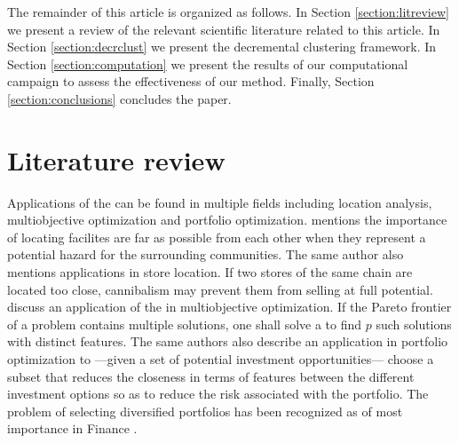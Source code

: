 \documentclass[ijoo,nonblindrev]{informs-ijoo}
\begin{document}
The remainder of this article is organized as follows. In Section \ref{section:litreview} we present a review of the relevant scientific literature related to this article. In Section \ref{section:decrclust} we present the decremental clustering framework. In Section \ref{section:computation} we present the results of our computational campaign to assess the effectiveness of our method. Finally, Section \ref{section:conclusions} concludes the paper.

\section{Literature review\label{section:litreview}}

Applications of the \pDP{} can be found in multiple fields including location analysis, multiobjective optimization and portfolio optimization. \citet{Kuby1987Programming} mentions the importance of locating facilites are far as possible from each other when they represent a potential hazard for the surrounding communities. The same author also mentions applications in store location. If two stores of the same chain are located too close, cannibalism may prevent them from selling at full potential. \citet{Saboonchi2014MaxMinMin} discuss an application of the \pDP{} in multiobjective optimization. If the Pareto frontier of a problem contains multiple solutions, one shall solve a \pDP{} to find $p$ such solutions with distinct features. The same authors also describe an application in portfolio optimization to ---given a set of potential investment opportunities--- choose a subset that reduces the closeness in terms of features between the different investment options so as to reduce the risk associated with the portfolio. The problem of selecting diversified portfolios has been recognized as of most importance in Finance \citep{Statman1987how}.
\end{document}
